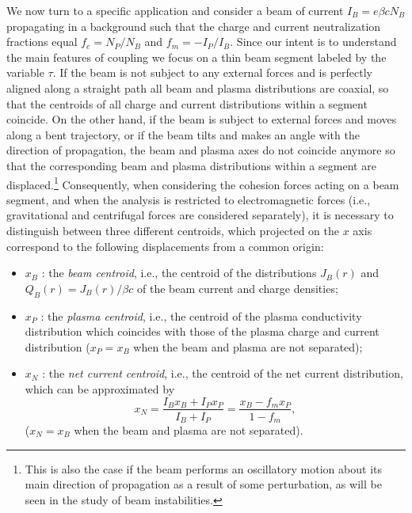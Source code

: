 \documentclass [12pt,a4paper,     ]{report} %
\begin{document}
   We now turn to a specific application and consider a beam of current $I_B = e\beta c N_B$ propagating in a background such that the charge and current neutralization fractions equal $f_e = N_P/N_B$ and $f_m= -I_P/I_B$.  Since our intent is to understand the main features of coupling we focus on a thin beam segment labeled by the variable $\tau$. If the beam is not subject to any external forces and is perfectly aligned along a straight path all beam and plasma distributions are coaxial, so that the centroids of all charge and current distributions within a segment coincide.  On the other hand, if the beam is subject to external forces and moves along a bent trajectory, or if the beam tilts and makes an angle with the direction of propagation, the beam and plasma axes do not coincide anymore so that the corresponding beam and plasma distributions within a segment are displaced.\footnote{This is also the case if the beam performs an oscillatory motion about its main direction of propagation as a result of some perturbation, as will be seen in the study of beam instabilities.}  Consequently, when considering the cohesion forces acting on a beam segment, and when the analysis is restricted to electromagnetic forces (i.e., gravitational and centrifugal forces are considered separately), it is necessary to distinguish between three different centroids, which projected on the $x$ axis correspond to the following displacements from a common origin:
%
\begin{itemize}

\item $x_B$ : the \emph{beam centroid}, i.e., the centroid of the distributions $J_B(r)$ and $Q_B(r)=J_B(r)/\beta c$ of the beam current and charge densities;

\item $x_P$ : the \emph{plasma centroid}, i.e., the centroid of the plasma conductivity distribution which coincides with those of the plasma charge and current distribution ($x_P = x_B$ when the beam and plasma are not separated);

\item $x_N$ : the \emph{net current centroid}, i.e., the centroid of the net current distribution, which can be approximated by
%
\begin{equation}\label{coh:7} %
   x_N = \frac{I_B x_B + I_P x_P}{I_B + I_P} = \frac{x_B - f_m x_P}{1-f_m},
\end{equation}
%
($x_N=x_B$ when the beam and plasma are not separated).

\end{itemize}
\end{document}

